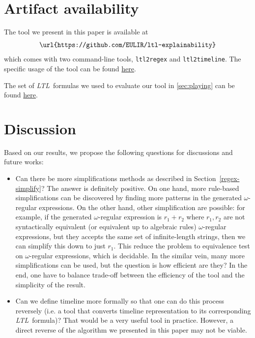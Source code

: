 \documentclass[conference]{IEEEtran}
\theoremstyle{definition}
\theoremstyle{remark}
\newcommand{\ltl}{\textit{LTL}}
\newcommand{\tool}{\hspace{0.1cm}\texttt{ltl2timeline}}
\begin{document}




\section{Artifact availability}
The tool we present in this paper is available at
\[
    \texttt{\url{https://github.com/EULIR/ltl-explainability}}
\]
which comes with two command-line tools, \texttt{ltl2regex} and \tool. The specific usage of the tool can be found  \href{https://github.com/EULIR/ltl-explainability#usage}{here}.

The set of \ltl\ formulas we used to evaluate our tool in \cref{sec:playing} can be found \href{https://github.com/EULIR/ltl-explainability/tree/main/ltl-formulas}{here}.

\section{Discussion}
Based on our results, we propose the following questions for discussions and future works:
\begin{itemize}
    \item Can there be more simplifications methods as described in Section~\ref{regex-simplify}? The answer is definitely positive. On one hand, more rule-based simplifications can be discovered by finding more patterns in the generated $\omega$-regular expressions. On the other hand, other simplification are possible: for example, if the generated $\omega$-regular expression is $r_1 + r_2$ where $r_1, r_2$ are not syntactically equivalent (or equivalent up to algebraic rules) $\omega$-regular expressions, but they accepts the same set of infinite-length strings, then we can simplify this down to just $r_1$. This reduce the problem to equivalence test on $\omega$-regular expressions, which is decidable. In the similar vein, many more simplifications can be used, but the question is how efficient are they? In the end, one have to balance trade-off between the efficiency of the tool and the simplicity of the result.
    \item Can we define timeline more formally so that one can do this process reversely (i.e. a tool that converts timeline representation to its corresponding \ltl\ formula)? That would be a very useful tool in practice. However, a direct reverse of the algorithm we presented in this paper may not be viable.
\end{itemize}
\end{document}
